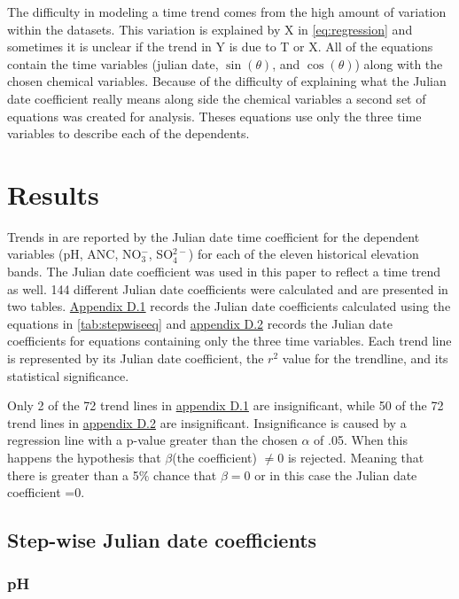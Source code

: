 

The difficulty in modeling a time trend comes from the high amount of variation within the datasets.  
This variation is explained by X in \autoref{eq:regression} and sometimes it is unclear if the trend in Y is due to T or X.
All of the equations contain the time variables (julian date, $\sin(\theta)$, and $\cos(\theta)$) along with the chosen chemical variables.  
Because of the difficulty of explaining what the Julian date coefficient really means along side the chemical variables a second set of equations was created for analysis.
Theses equations use only the three time variables to describe each of the dependents.

\section{Results}
Trends in \citet{robinson2008ph} are reported by the Julian date time coefficient for the dependent variables (pH, ANC, NO$_3^-$, SO$_4^{2-}$)  for each of the eleven historical elevation bands.
The Julian date coefficient was used in this paper to reflect a time trend as well.
144 different Julian date coefficients were calculated and are presented in two tables.  
\hyperref[app:Step-wise julian date]{Appendix D.1} records the Julian date coefficients calculated using the equations in \autoref{tab:stepwiseeq}  and \hyperref[app:time vars]{appendix D.2} records the Julian date coefficients for  equations containing only the three time variables.  
Each trend line is represented by its Julian date coefficient, the $r^2$ value for the trendline, and its statistical significance.

Only 2 of the 72 trend lines in \hyperref[app:Step-wise julian date]{appendix D.1} are insignificant, while 50 of the 72 trend lines in  \hyperref[app:time vars]{appendix D.2} are insignificant.  
Insignificance is caused by a regression line with a p-value greater than the chosen $\alpha$ of .05.
When this happens the hypothesis that $\beta$(the coefficient) $\neq 0$  is rejected.
Meaning that there is greater than a 5$\%$ chance that $\beta=0$ or in this case the Julian date coefficient =0. 

\subsection{Step-wise Julian date coefficients}

\subsubsection{pH}

